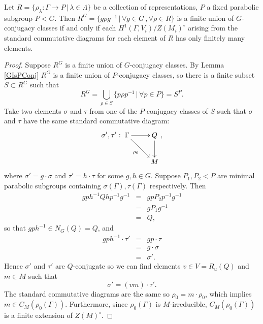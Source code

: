 \begin{lemma}\label{PConjIsHOne} Let $R=\{\rho_\lambda:\Gamma\rightarrow P\, |\, \lambda \in \Lambda\}$ be a collection of representations, $P$ a fixed parabolic subgroup $P<G$. Then $R^G = \{g\rho g^{-1}\,|\,\forall g\in G\, ,\forall\rho\in R\}$ is a finite union of $G$-conjugacy classes if and only if each $H^1(\Gamma, V_i)/Z(M_i)^\circ$ arising from the standard commutative diagrams for each element of $R$ has only finitely many elements.
\end{lemma}
\begin{proof}
	Suppose $R^G$ is a finite union of $G$-conjugacy classes. By Lemma \ref{GIsPConj} $R^G$ is a finite union of $P$-conjugacy classes, so there is a finite subset $S\subset R^G$ such that
	\begin{displaymath}
		R^G = \bigcup_{\rho \in S}\{p\rho p^{-1}\,|\,\forall p\in P\} = S^P.
	\end{displaymath}
	Take two elements $\sigma$ and $\tau$ from one of the $P$-conjugacy classes of $S$ such that $\sigma$ and $\tau$ have the same standard commutative diagram:
	\begin{displaymath}
		\sigma',\tau':\xymatrix{
			\Gamma \ar[r] \ar[rd]_{\rho_0} & Q \ar[d]\\
		& M},
	\end{displaymath}
	where $\sigma' = g\cdot\sigma$ and $\tau' = h\cdot\tau$ for some $g, h\in G$. Suppose $P_1,P_2<P$ are minimal parabolic subgroups containing $\sigma(\Gamma), \tau(\Gamma)$ respectively. Then
	\begin{eqnarray*}
		gph^{-1}Qhp^{-1}g^{-1} &=& gpP_2p^{-1}g^{-1} \\
		&=& gP_1g^{-1} \\
		&=& Q,
	\end{eqnarray*}
	so that $gph^{-1}\in N_G(Q) = Q$, and
	\begin{eqnarray*}
		gph^{-1}\cdot\tau' &=& gp\cdot \tau \\
		&=& g\cdot \sigma \\
		&=& \sigma'.
	\end{eqnarray*}
	Hence $\sigma'$ and $\tau'$ are $Q$-conjugate so we can find elements $v\in V = R_u(Q)$ and $m\in M$ such that
	\begin{displaymath}
		\sigma' = (vm)\cdot\tau'.
	\end{displaymath}
	The standard commutative diagrams are the same so $\rho_0 = m\cdot\rho_0$, which implies $m\in C_M(\rho_0(\Gamma))$. Furthermore, since $\rho_0(\Gamma)$ is $M$-irreducible, $C_M(\rho_0(\Gamma))$ is a finite extension of $Z(M)^\circ$.
	

\end{proof}
